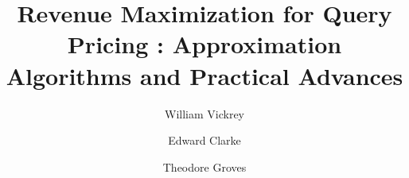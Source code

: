 \documentclass[format=acmsmall, review=false]{acmart}
\begin{document}
\title[Revenue Maximizing Algorithms for Query Pricing]{Revenue Maximization for Query Pricing : Approximation Algorithms and Practical Advances}  
\author{William Vickrey}
\author{Edward Clarke}
\author{Theodore Groves}


\maketitle







\end{document}
